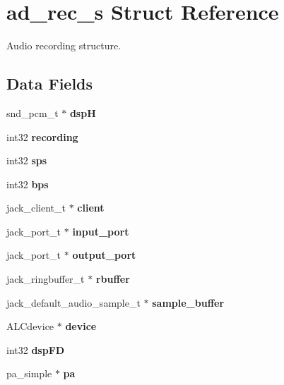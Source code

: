 \section{ad\+\_\+rec\+\_\+s Struct Reference}
\label{structad__rec__s}


Audio recording structure.  


\subsection*{Data Fields}
\begin{DoxyCompactItemize}
\item 
\mbox{\label{structad__rec__s_af4b2cd7de40e5b2a48d2d6878d33cc18}} 
snd\+\_\+pcm\+\_\+t $\ast$ {\bfseries dspH}
\item 
\mbox{\label{structad__rec__s_a5ddf90deb3806752a1fa3152fe864047}} 
int32 {\bfseries recording}
\item 
\mbox{\label{structad__rec__s_a2c5120af44acf19c5c7c63778bc932a3}} 
int32 {\bfseries sps}
\item 
\mbox{\label{structad__rec__s_a731523ef22607a580877bdcc563d9e5e}} 
int32 {\bfseries bps}
\item 
\mbox{\label{structad__rec__s_acd700500a367b0cb21306b7152f723af}} 
jack\+\_\+client\+\_\+t $\ast$ {\bfseries client}
\item 
\mbox{\label{structad__rec__s_a3acb1e45a779726ee6370ee4f773ed12}} 
jack\+\_\+port\+\_\+t $\ast$ {\bfseries input\+\_\+port}
\item 
\mbox{\label{structad__rec__s_aa063dd1156101f957df117a0cd2407be}} 
jack\+\_\+port\+\_\+t $\ast$ {\bfseries output\+\_\+port}
\item 
\mbox{\label{structad__rec__s_a39c7bd9b729d4ec0da0bd2c9cfa5e240}} 
jack\+\_\+ringbuffer\+\_\+t $\ast$ {\bfseries rbuffer}
\item 
\mbox{\label{structad__rec__s_a4118f000ae396de0faca9cbf07c2ee61}} 
jack\+\_\+default\+\_\+audio\+\_\+sample\+\_\+t $\ast$ {\bfseries sample\+\_\+buffer}
\item 
\mbox{\label{structad__rec__s_a3e4378783effb06051461aca5a3d2f6c}} 
A\+L\+Cdevice $\ast$ {\bfseries device}
\item 
\mbox{\label{structad__rec__s_a7bd3eea2ed7b7be7155d4304505b140e}} 
int32 {\bfseries dsp\+FD}
\item 
\mbox{\label{structad__rec__s_a8ebda5d453f68928e21548739f27ceb9}} 
pa\+\_\+simple $\ast$ {\bfseries pa}
\item 
\mbox{\label{structad__rec__s_a79081fc333f54eff7afdc23404f3ae69}} 

\end{DoxyCompactItemize}
